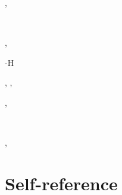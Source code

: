 \documentclass[a4paper]{article}
\begin{document}
\begin{alectryon}
\begin{sentence}
\begin{output}
\begin{goals}
\begin{extragoals}
\begin{goal}
\begin{conclusion}
            \end{conclusion}
          \end{goal}
        \end{extragoals}
      \end{goals}
    \end{output}
  \end{sentence}
  \sep
  \begin{sentence}
    \begin{input}
      ~~\PY{o}{[}\PY{o}{]:}~~
    \end{input}
    \sep
    \begin{output}
      \begin{goals}
        \begin{goal}
          \begin{hyps}
            \hyp{H}{}
          \end{hyps}
          \sep
          \sep
          \begin{conclusion}
          \end{conclusion}
        \end{goal}
      \end{goals}
    \end{output}
  \end{sentence}
  \sep
  \begin{sentence}
    \begin{input}
      ~~\PY{o}{[}\PY{o}{]:}~~\nl
    \end{input}
  \end{sentence}
  \sep
  \begin{sentence}
    \begin{input}
    \end{input}
  \end{sentence}
\end{alectryon}


\section{Self-reference%
  \label{self-reference}%
}
\end{document}
